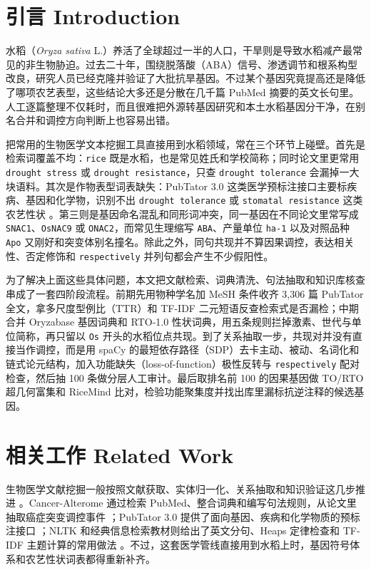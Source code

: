 \documentclass[conference]{IEEEtran}
\begin{document}
\section{引言 Introduction}

水稻（\textit{Oryza sativa} L.）养活了全球超过一半的人口，干旱则是导致水稻减产最常见的非生物胁迫。过去二十年，围绕脱落酸（ABA）信号、渗透调节和根系构型改良，研究人员已经克隆并验证了大批抗旱基因。不过某个基因究竟提高还是降低了哪项农艺表型，这些结论大多还是分散在几千篇 PubMed 摘要的英文长句里。人工逐篇整理不仅耗时，而且很难把外源转基因研究和本土水稻基因分干净，在别名合并和调控方向判断上也容易出错。

把常用的生物医学文本挖掘工具直接用到水稻领域，常在三个环节上碰壁。首先是检索词覆盖不均：\texttt{rice} 既是水稻，也是常见姓氏和学校简称；同时论文里更常用 \texttt{drought stress} 或 \texttt{drought resistance}，只查 \texttt{drought tolerance} 会漏掉一大块语料。其次是作物表型词表缺失：PubTator 3.0 这类医学预标注接口主要标疾病、基因和化学物，识别不出 \texttt{drought tolerance} 或 \texttt{stomatal resistance} 这类农艺性状 \cite{wei2024pubtator3}。第三则是基因命名混乱和同形词冲突，同一基因在不同论文里常写成 \texttt{SNAC1}、\texttt{OsNAC9} 或 \texttt{ONAC2}，而常见生理缩写 \texttt{ABA}、产量单位 \texttt{ha-1} 以及对照品种 \texttt{Apo} 又刚好和突变体别名撞名。除此之外，同句共现并不算因果调控，表达相关性、否定修饰和 \texttt{respectively} 并列句都会产生不少假阳性。

为了解决上面这些具体问题，本文把文献检索、词典清洗、句法抽取和知识库核查串成了一套四阶段流程。前期先用物种学名加 MeSH 条件收齐 3,306 篇 PubTator 全文，拿多尺度型例比（TTR）和 TF-IDF 二元短语反查检索式是否漏检；中期合并 Oryzabase 基因词典和 RTO-1.0 性状词典，用五条规则拦掉激素、世代与单位简称，再只留以 \texttt{Os} 开头的水稻位点共现。到了关系抽取一步，共现对并没有直接当作调控，而是用 spaCy 的最短依存路径（SDP）去卡主动、被动、名词化和链式论元结构，加入功能缺失（loss-of-function）极性反转与 \texttt{respectively} 配对检查，然后抽 100 条做分层人工审计。最后取排名前 100 的因果基因做 TO/RTO 超几何富集和 RiceMind 比对，检验功能聚集度并找出库里漏标抗逆注释的候选基因。

\section{相关工作 Related Work}

生物医学文献挖掘一般按照文献获取、实体归一化、关系抽取和知识验证这几步推进 \cite{zhao2021bionlp}。Cancer-Alterome 通过检索 PubMed、整合词典和编写句法规则，从论文里抽取癌症突变调控事件 \cite{canceralterome2024}；PubTator 3.0 提供了面向基因、疾病和化学物质的预标注接口 \cite{wei2024pubtator3}；NLTK 和经典信息检索教材则给出了英文分句、Heaps 定律检查和 TF-IDF 主题计算的常用做法 \cite{nltk2009,manning2008ir,slides2026}。不过，这套医学管线直接用到水稻上时，基因符号体系和农艺性状词表都得重新补齐。
\end{document}
